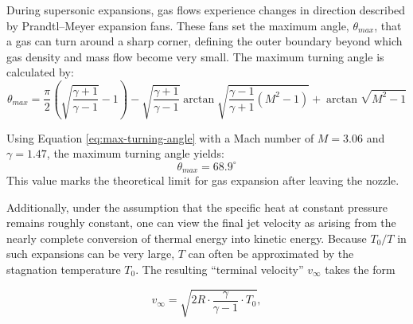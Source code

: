 		During supersonic expansions, gas flows experience changes in direction described by Prandtl–Meyer expansion fans.
		These fans set the maximum angle, $\theta_{max}$, that a gas can turn around a sharp corner, defining the outer boundary beyond which gas density and mass flow become very small.
		The maximum turning angle is calculated by:
		\begin{equation}
			\theta_{max} = \frac{\pi}{2} \left(\sqrt{\frac{\gamma + 1}{\gamma - 1}} - 1\right) - \sqrt{\frac{\gamma + 1}{\gamma - 1}}\arctan{\sqrt{\frac{\gamma - 1}{\gamma + 1}(M^2 - 1)}} + \arctan{\sqrt{M^2 -1}}
			\label{eq:max-turning-angle}
		\end{equation}

		Using Equation \eqref{eq:max-turning-angle} with a Mach number of $M=3.06$ and $\gamma=1.47$, the maximum turning angle yields:
		$$
			\theta_{max} = 68.9^\circ
		$$
		This value marks the theoretical limit for gas expansion after leaving the nozzle.

		Additionally, under the assumption that the specific heat at constant pressure remains roughly constant, one can view the final jet velocity as arising from the nearly complete conversion of thermal energy into kinetic energy.
		Because $T_0 / T$ in such expansions can be very large, $T$ can often be approximated by the stagnation temperature $T_0$.
		The resulting “terminal velocity” $v_{\infty}$ takes the form

		\begin{equation}
			v_{\infty} = \sqrt{2R \cdot \frac{\gamma}{\gamma - 1} \cdot T_0},
			\label{eq:terminal_velocity}
		\end{equation}

